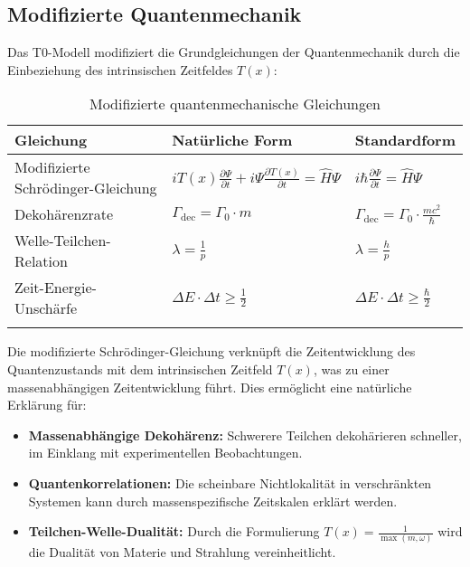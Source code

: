 \documentclass[12pt,a4paper]{article}
\newcommand{\Tfield}{T(x)}
\begin{document}
	\subsection{Modifizierte Quantenmechanik}
	
	Das T0-Modell modifiziert die Grundgleichungen der Quantenmechanik durch die Einbeziehung des intrinsischen Zeitfeldes $\Tfield$:
	
	\begin{table}[ht]
		\centering
		\begin{adjustbox}{scale=1.1}
			\begin{tabular}{lll}
				\hline
				\textbf{Gleichung} & \textbf{Natürliche Form} & \textbf{Standardform} \\
				\hline
				Modifizierte Schrödinger-Gleichung & $i\Tfield\frac{\partial\Psi}{\partial t} + i\Psi\frac{\partial \Tfield}{\partial t} = \hat{H}\Psi$ & $i\hbar\frac{\partial\Psi}{\partial t} = \hat{H}\Psi$ \\
				Dekohärenzrate & $\Gamma_{\text{dec}} = \Gamma_0 \cdot m$ & $\Gamma_{\text{dec}} = \Gamma_0 \cdot \frac{mc^2}{\hbar}$ \\
				Welle-Teilchen-Relation & $\lambda = \frac{1}{p}$ & $\lambda = \frac{h}{p}$ \\
				Zeit-Energie-Unschärfe & $\Delta E \cdot \Delta t \geq \frac{1}{2}$ & $\Delta E \cdot \Delta t \geq \frac{\hbar}{2}$ \\
				\hline
			\multicolumn{2}{c}{} \\
				\hline
			\end{tabular}
		\end{adjustbox}
		\caption{Modifizierte quantenmechanische Gleichungen}
		\label{tab:qm_equations}
	\end{table}
	
	Die modifizierte Schrödinger-Gleichung verknüpft die Zeitentwicklung des Quantenzustands mit dem intrinsischen Zeitfeld $\Tfield$, was zu einer massenabhängigen Zeitentwicklung führt. Dies ermöglicht eine natürliche Erklärung für:
	
	\begin{itemize}
		\item \textbf{Massenabhängige Dekohärenz:} Schwerere Teilchen dekohärieren schneller, im Einklang mit experimentellen Beobachtungen.
		\item \textbf{Quantenkorrelationen:} Die scheinbare Nichtlokalität in verschränkten Systemen kann durch massenspezifische Zeitskalen erklärt werden.
		\item \textbf{Teilchen-Welle-Dualität:} Durch die Formulierung $\Tfield = \frac{1}{\max(m,\omega)}$ wird die Dualität von Materie und Strahlung vereinheitlicht.
	\end{itemize}
	
\end{document}
